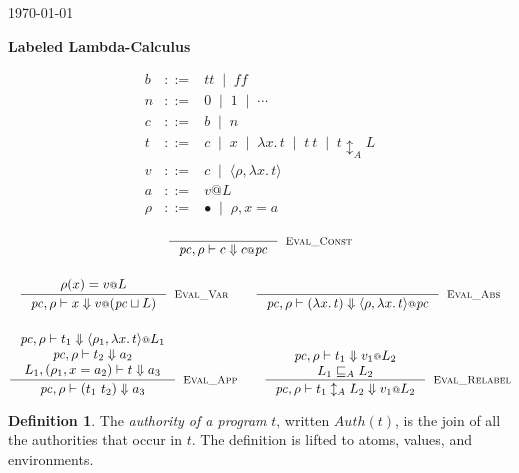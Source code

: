 \documentclass{article}
\makeatletter
\newcommand{\at}{\ensuremath{{\scriptstyle{@}}}}
\newcommand{\pc}{\ensuremath{{\mathit{pc}}}}
\theoremstyle{definition}
\newtheorem{definition}[theorem]{Definition}
\makeatother
\begin{document}
\begin{flushright}
  \today
\end{flushright}

\begin{flushleft}
  \textbf{Labeled Lambda-Calculus} 
\end{flushleft}

\[
\begin{array}{lcl}
  b & ::= &
  \mathit{tt}\;\; |\;\;
  \mathit{ff}
  \\
  n & ::= &
  0\;\; |\;\;
  1\;\; |\;\;
  \cdots
  \\
  c & ::= &
  b\;\; |\;\;
  n
  \\
  t & ::= &
  c\;\; |\;\;
  x\;\; |\;\;
  \lambda{x}.\, t\;\; |\;\;
  t\ t\;\; |\;\;
  t \updownarrow_{A} L
  \\
  v & ::= &
  c\;\; |\;\;
  \langle{\rho, \lambda{x}.\, t\rangle}
  \\
  a & ::= &
  v \at L
  \\
  \rho & ::= &
  \bullet\;\; |\;\;
  \rho, x = a
\end{array}
\]

\begin{gather*}
  \inference{}{
    \pc, \rho |- c \Downarrow c \at \pc
  }[\textsc{Eval\_Const}]
  \\[3ex]
  \inference{
    \rho(x) = v \at L
  }{
    \pc, \rho |- x \Downarrow v \at (\pc \sqcup L)
  }[\textsc{Eval\_Var}]
  \qquad
  \inference{}{
    \pc, \rho |- (\lambda{x}.\, t) \Downarrow
    \langle{\rho, \lambda{x}.\, t\rangle} \at \pc
  }[\textsc{Eval\_Abs}]
  \\[3ex]
  \inference{
    \pc, \rho |- t_1 \Downarrow \langle{\rho_1, \lambda{x}.\, t\rangle} \at L_1
    \\
    \pc, \rho |- t_2 \Downarrow a_2
    \\
    L_1, (\rho_1, x = a_2) |- t \Downarrow a_3
  }{
    \pc, \rho |- (t_1\ t_2) \Downarrow a_3
  }[\textsc{Eval\_App}]
  \qquad
  \inference{
    \pc, \rho |- t_1 \Downarrow v_1 \at L_2
    \\
    L_1 \sqsubseteq_{A} L_2
  }{
    \pc, \rho |- t_1 \updownarrow_{A} L_2 \Downarrow v_1 \at L_2
  }[\textsc{Eval\_Relabel}]
  \\
\end{gather*}

\begin{definition}
  The \emph{authority of a program} $t$, written $\mathit{Auth}(t)$, is the
  join of all the authorities that occur in $t$. The definition is lifted to
  atoms, values, and environments.
\end{definition}
\end{document}
